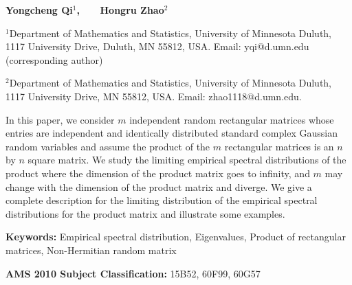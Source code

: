 \documentclass[11pt]{article}
\numberwithin{equation}{section}
\begin{document}
\thispagestyle{empty}


\vspace{10pt} \noindent \textbf{Yongcheng Qi$^1$, ~~~Hongru
Zhao$^2$}

\vspace{20pt}

{\footnotesize
\noindent $^1$Department of Mathematics and
Statistics, University of Minnesota Duluth, 1117 University Drive,
Duluth, MN 55812, USA. Email: yqi@d.umn.edu  (corresponding author)

\noindent $^2$Department of Mathematics and Statistics, University
of Minnesota Duluth, 1117 University Drive, MN 55812, USA. Email:
zhao1118@d.umn.edu.
}


\date{\today}

\vspace{20pt}









{\small

 In this paper, we consider $m$ independent
random rectangular matrices whose entries are independent and
identically distributed standard complex Gaussian random variables
and assume the product of the $m$ rectangular matrices is an $n$ by
$n$ square matrix. We study the limiting empirical spectral
distributions of the product where the dimension of the product
matrix goes to infinity, and $m$ may change with the dimension of
the product matrix and diverge. We give a complete description for
the limiting distribution of the empirical spectral distributions
for the product matrix and illustrate some examples.



\vspace{10pt}

 \noindent \textbf{Keywords:\/} Empirical spectral distribution,
Eigenvalues, Product of rectangular matrices, Non-Hermitian random
matrix

\vspace{10pt}

\noindent\textbf{AMS 2010 Subject Classification: \/} 15B52, 60F99, 60G57 \\
}
\end{document}
